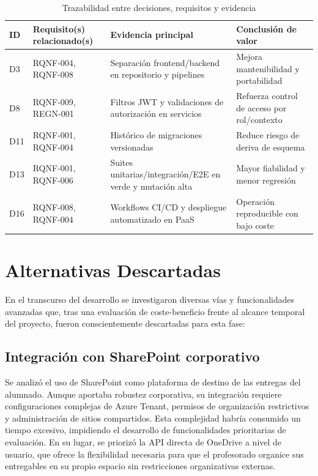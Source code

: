 \begin{table}[!htbp]
\centering
\begin{tabular}{|P{1.6cm}|P{2.8cm}|P{2.9cm}|P{4.7cm}|}
\hline
\textbf{ID} & \textbf{Requisito(s) relacionado(s)} & \textbf{Evidencia principal} & \textbf{Conclusi\'on de valor} \\
\hline
D3 & RQNF-004, RQNF-008 & Separaci\'on frontend/backend en repositorio y pipelines & Mejora mantenibilidad y portabilidad \\
\hline
D8 & RQNF-009, REGN-001 & Filtros JWT y validaciones de autorizaci\'on en servicios & Refuerza control de acceso por rol/contexto \\
\hline
D11 & RQNF-001, RQNF-004 & Hist\'orico de migraciones versionadas & Reduce riesgo de deriva de esquema \\
\hline
D13 & RQNF-001, RQNF-006 & Suites unitarias/integraci\'on/E2E en verde y mutaci\'on alta & Mayor fiabilidad y menor regresi\'on \\
\hline
D16 & RQNF-008, RQNF-004 & Workflows CI/CD y despliegue automatizado en PaaS & Operaci\'on reproducible con bajo coste \\
\hline
\end{tabular}
\caption{Trazabilidad entre decisiones, requisitos y evidencia}
\label{tab:trazabilidad-decisiones}
\end{table}

\FloatBarrier
\section{Alternativas Descartadas}

En el transcurso del desarrollo se investigaron diversas v\'ias y funcionalidades avanzadas que, tras una evaluaci\'on de coste-beneficio frente al alcance temporal del proyecto, fueron conscientemente descartadas para esta fase:

\subsection{Integraci\'on con SharePoint corporativo}
Se analiz\'o el uso de SharePoint como plataforma de destino de las entregas del alumnado. Aunque aportaba robustez corporativa, su integraci\'on requiere configuraciones complejas de Azure Tenant, permisos de organizaci\'on restrictivos y administraci\'on de sitios compartidos. Esta complejidad habr\'ia consumido un tiempo excesivo, impidiendo el desarrollo de funcionalidades prioritarias de evaluaci\'on. En su lugar, se prioriz\'o la API directa de OneDrive a nivel de usuario, que ofrece la flexibilidad necesaria para que el profesorado organice sus entregables en su propio espacio sin restricciones organizativas externas.

